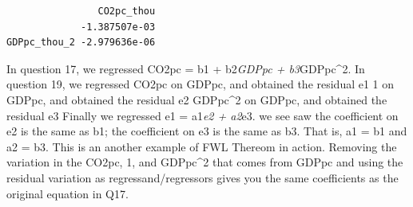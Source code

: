 \documentclass[
  letterpaper,
  DIV=11,
  numbers=noendperiod]{scrartcl}
\begin{document}
\begin{verbatim}
                CO2pc_thou
             -1.387507e-03
GDPpc_thou_2 -2.979636e-06
\end{verbatim}

In question 17, we regressed CO2pc = b1 + b2\emph{GDPpc + b3}GDPpc\^{}2.
In question 19, we regressed CO2pc on GDPpc, and obtained the residual
e1 1 on GDPpc, and obtained the residual e2 GDPpc\^{}2 on GDPpc, and
obtained the residual e3 Finally we regressed e1 = a1\emph{e2 + a2}e3.
we see saw the coefficient on e2 is the same as b1; the coefficient on
e3 is the same as b3. That is, a1 = b1 and a2 = b3. This is an another
example of FWL Thereom in action. Removing the variation in the CO2pc,
1, and GDPpc\^{}2 that comes from GDPpc and using the residual variation
as regressand/regressors gives you the same coefficients as the original
equation in Q17.
\end{document}
